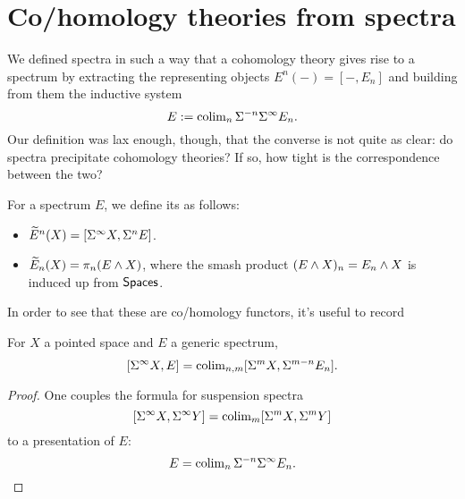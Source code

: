 




\section{Co/homology theories from spectra}

We defined spectra in such a way that a cohomology theory gives rise to a spectrum by extracting the representing objects $E^n(-) = [-, E_n]$ and building from them the inductive system \[E := \operatorname{colim}_n \Sigma^{-n} \Sigma^\infty E_n.\]
Our definition was lax enough, though, that the converse is not quite as clear: do spectra precipitate cohomology theories?
If so, how tight is the correspondence between the two?

\begin{definition}
For a spectrum $E$, we define its  as follows:
\begin{itemize}
    \item $\widetilde E^n(X) = [\Sigma^\infty X, \Sigma^n E]$.
    \item $\widetilde E_n(X) = \pi_n(E \wedge X)$, where the smash product $(E \wedge X)_n =  E_n \wedge X$ is induced up from $\mathsf{Spaces}$.
\end{itemize}
\end{definition}

In order to see that these are co/homology functors, it's useful to record
\begin{lemma}
%
For $X$ a pointed space and $E$ a generic spectrum,%
\[[\Sigma^\infty X, E] = \operatorname{colim}_{n,m} [\Sigma^m X, \Sigma^{m-n} E_n].\]
\end{lemma}
\begin{proof}
One couples the formula for suspension spectra \[[\Sigma^\infty X, \Sigma^\infty Y] = \operatorname{colim}_m [\Sigma^m X, \Sigma^m Y]\] to a presentation of $E$: \[E = \operatorname{colim}_n \Sigma^{-n} \Sigma^\infty E_n. \qedhere\]
\end{proof}

